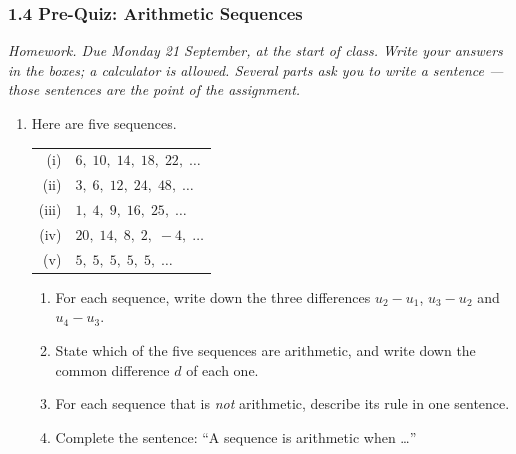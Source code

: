 \documentclass[12pt, twoside]{article}
\begin{document}
\subsubsection*{1.4 Pre-Quiz: Arithmetic Sequences}

\emph{Homework. Due Monday 21 September, at the start of class. Write your
answers in the boxes; a calculator is allowed. Several parts ask you to write
a sentence --- those sentences are the point of the assignment.}

\begin{enumerate}[itemsep=0.15cm]

\item[1.]

Here are five sequences.

\begin{center}
\begin{tabular}{rl}
(i) & $6,\; 10,\; 14,\; 18,\; 22,\; \ldots$ \\[2pt]
(ii) & $3,\; 6,\; 12,\; 24,\; 48,\; \ldots$ \\[2pt]
(iii) & $1,\; 4,\; 9,\; 16,\; 25,\; \ldots$ \\[2pt]
(iv) & $20,\; 14,\; 8,\; 2,\; -4,\; \ldots$ \\[2pt]
(v) & $5,\; 5,\; 5,\; 5,\; 5,\; \ldots$ \\
\end{tabular}
\end{center}

\begin{enumerate}[itemsep=0.1cm]
  \item For each sequence, write down the three differences
  $u_{2} - u_{1}$, $u_{3} - u_{2}$ and $u_{4} - u_{3}$.
  \item State which of the five sequences are arithmetic, and write down
  the common difference $d$ of each one.
  \item For each sequence that is \emph{not} arithmetic, describe its rule
  in one sentence.
  \item Complete the sentence: ``A sequence is arithmetic when \ldots''
\end{enumerate}



\end{enumerate}
\end{document}
